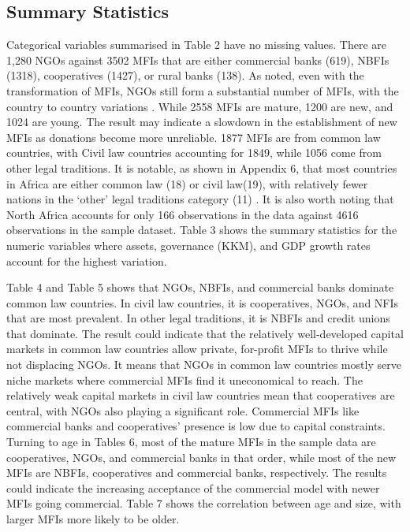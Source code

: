 \documentclass[a4paper,nobind]{templates/ociamthesis}
\begin{document}
\newpage

\hypertarget{summary-statistics}{%
\subsection{Summary Statistics}\label{summary-statistics}}

Categorical variables summarised in Table 2 have no missing values. There are 1,280 NGOs against 3502 MFIs that are either commercial banks (619), NBFIs (1318), cooperatives (1427), or rural banks (138). As noted, even with the transformation of MFIs, NGOs still form a substantial number of MFIs, with the country to country variations \autocite{d2017ngos}. While 2558 MFIs are mature, 1200 are new, and 1024 are young. The result may indicate a slowdown in the establishment of new MFIs as donations become more unreliable. 1877 MFIs are from common law countries, with Civil law countries accounting for 1849, while 1056 come from other legal traditions. It is notable, as shown in Appendix 6, that most countries in Africa are either common law (18) or civil law(19), with relatively fewer nations in the `other' legal traditions category (11) \autocite{oto2014distribution}. It is also worth noting that North Africa accounts for only 166 observations in the data against 4616 observations in the sample dataset. Table 3 shows the summary statistics for the numeric variables where assets, governance (KKM), and GDP growth rates account for the highest variation.

Table 4 and Table 5 shows that NGOs, NBFIs, and commercial banks dominate common law countries. In civil law countries, it is cooperatives, NGOs, and NFIs that are most prevalent. In other legal traditions, it is NBFIs and credit unions that dominate. The result could indicate that the relatively well-developed capital markets in common law countries allow private, for-profit MFIs to thrive while not displacing NGOs. It means that NGOs in common law countries mostly serve niche markets where commercial MFIs find it uneconomical to reach. The relatively weak capital markets in civil law countries mean that cooperatives are central, with NGOs also playing a significant role. Commercial MFIs like commercial banks and cooperatives' presence is low due to capital constraints. Turning to age in Tables 6, most of the mature MFIs in the sample data are cooperatives, NGOs, and commercial banks in that order, while most of the new MFIs are NBFIs, cooperatives and commercial banks, respectively. The results could indicate the increasing acceptance of the commercial model with newer MFIs going commercial. Table 7 shows the correlation between age and size, with larger MFIs more likely to be older.
\end{document}
